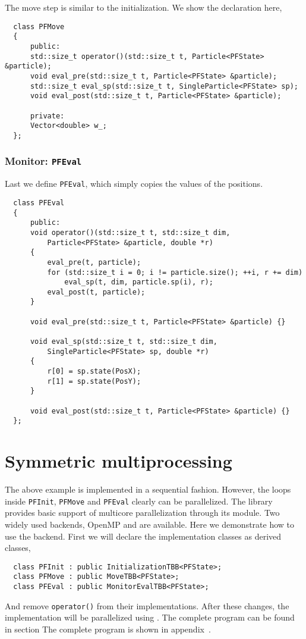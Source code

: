 The move step is similar to the initialization. We show the declaration here,
\begin{Verbatim}
  class PFMove
  {
      public:
      std::size_t operator()(std::size_t t, Particle<PFState> &particle);
      void eval_pre(std::size_t t, Particle<PFState> &particle);
      std::size_t eval_sp(std::size_t t, SingleParticle<PFState> sp);
      void eval_post(std::size_t t, Particle<PFState> &particle);

      private:
      Vector<double> w_;
  };
\end{Verbatim}

\subsubsection{Monitor: \texttt{PFEval}}

Last we define \verb|PFEval|, which simply copies the values of the positions.
\begin{Verbatim}
  class PFEval
  {
      public:
      void operator()(std::size_t t, std::size_t dim,
          Particle<PFState> &particle, double *r)
      {
          eval_pre(t, particle);
          for (std::size_t i = 0; i != particle.size(); ++i, r += dim)
              eval_sp(t, dim, particle.sp(i), r);
          eval_post(t, particle);
      }

      void eval_pre(std::size_t t, Particle<PFState> &particle) {}

      void eval_sp(std::size_t t, std::size_t dim,
          SingleParticle<PFState> sp, double *r)
      {
          r[0] = sp.state(PosX);
          r[1] = sp.state(PosY);
      }

      void eval_post(std::size_t t, Particle<PFState> &particle) {}
  };
\end{Verbatim}

\section{Symmetric multiprocessing}
\label{sec:Symmetric multiprocessing}

The above example is implemented in a sequential fashion. However, the loops
inside \verb|PFInit|, \verb|PFMove| and \verb|PFEval| clearly can be
parallelized. The library provides basic support of multicore parallelization
through its \smp module. Two widely used backends, OpenMP and \tbb are
available. Here we demonstrate how to use the \tbb backend. First we will
declare the implementation classes as derived classes,
\begin{Verbatim}
  class PFInit : public InitializationTBB<PFState>;
  class PFMove : public MoveTBB<PFState>;
  class PFEval : public MonitorEvalTBB<PFState>;
\end{Verbatim}
And remove \verb|operator()| from their implementations. After these changes,
the implementation will be parallelized using \tbb. The complete program can be
found in section The complete program is shown in
appendix~.

